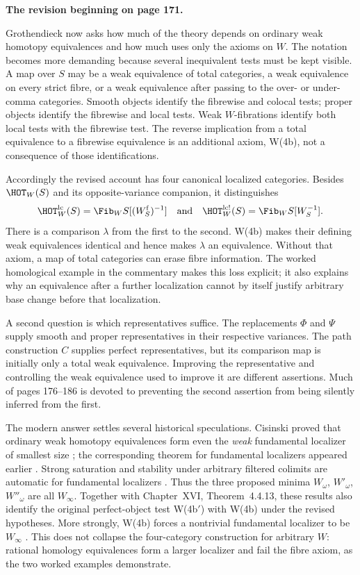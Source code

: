 \medskip\noindent\textbf{The revision beginning on page 171.}

Grothendieck now asks how much of the theory depends on ordinary weak homotopy equivalences and how much uses only the axioms on $W$. The notation becomes more demanding because several inequivalent tests must be kept visible. A map over $S$ may be a weak equivalence of total categories, a weak equivalence on every strict fibre, or a weak equivalence after passing to the over- or under-comma categories. Smooth objects identify the fibrewise and colocal tests; proper objects identify the fibrewise and local tests. Weak $W$-fibrations identify both local tests with the fibrewise test. The reverse implication from a total equivalence to a fibrewise equivalence is an additional axiom, W(4b), not a consequence of those identifications.

Accordingly the revised account has four canonical localized categories. Besides $\HOT_W(S)$ and its opposite-variance companion, it distinguishes
\[
 \HOT_W^{\mathrm{lc}}(S)=\Fib_WS[(W_S^{\mathrm f})^{-1}]
 \quad\hbox{and}\quad
 \HOT_W^{\mathrm{lc}!}(S)=\Fib_WS[W_S^{-1}].
\]
There is a comparison $\lambda$ from the first to the second. W(4b) makes their defining weak equivalences identical and hence makes $\lambda$ an equivalence. Without that axiom, a map of total categories can erase fibre information. The worked homological example in the commentary makes this loss explicit; it also explains why an equivalence after a further localization cannot by itself justify arbitrary base change before that localization.

A second question is which representatives suffice. The replacements $\Phi$ and $\Psi$ supply smooth and proper representatives in their respective variances. The path construction $C$ supplies perfect representatives, but its comparison map is initially only a total weak equivalence. Improving the representative and controlling the weak equivalence used to improve it are different assertions. Much of pages 176--186 is devoted to preventing the second assertion from being silently inferred from the first.

The modern answer settles several historical speculations. Cisinski proved that ordinary weak homotopy equivalences form even the \emph{weak} fundamental localizer of smallest size \citep[Theorem~6.1.18]{Cisinski2006}; the corresponding theorem for fundamental localizers appeared earlier \citep[Theorem~2.2.11]{Cisinski2004Minimal}. Strong saturation and stability under arbitrary filtered colimits are automatic for fundamental localizers \citep[Proposition~4.2.4 and Corollary~4.2.22]{Cisinski2006}. Thus the three proposed minima $W_\omega$, $W'_\omega$, $W''_\omega$ are all $W_\infty$. Together with Chapter~XVI, Theorem~4.4.13, these results also identify the original perfect-object test W(4b$'$) with W(4b) under the revised hypotheses. More strongly, W(4b) forces a nontrivial fundamental localizer to be $W_\infty$ \citep[Theorem~6.4.22 and Remark~6.4.23]{Cisinski2006}. This does not collapse the four-category construction for arbitrary $W$: rational homology equivalences form a larger localizer and fail the fibre axiom, as the two worked examples demonstrate.

